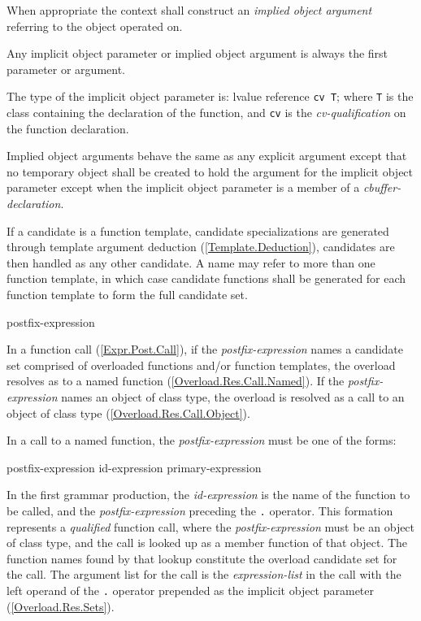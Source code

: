 \p When appropriate the context shall construct an \textit{implied object argument}
referring to the object operated on.

\p Any implicit object parameter or implied object argument is always
the first parameter or argument.

\p The type of the implicit object parameter is: lvalue reference \texttt{cv T}; where \texttt{T}
is the class containing the declaration of the function, and \texttt{cv} is the
\textit{cv-qualification} on the function declaration.

\p Implied object arguments behave the same as any explicit argument except that no temporary
object shall be created to hold the argument for the implicit object parameter
except when the implicit object parameter is a member of a
\textit{cbuffer-declaration}.

\p If a candidate is a function template, candidate specializations are generated
through template argument deduction (\ref{Template.Deduction}), candidates are
then handled as any other candidate. A name may refer to more than one function
template, in which case candidate functions shall be generated for each function
template to form the full candidate set.


\begin{innergrammar}
postfix-expression \terminal{(}  \terminal{)}
\end{innergrammar}

\p In a function call (\ref{Expr.Post.Call}), if the \textit{postfix-expression} names a
candidate set comprised of overloaded functions and/or function templates, the
overload resolves as to a named function (\ref{Overload.Res.Call.Named}). If the
\textit{postfix-expression} names an object of class type, the overload is resolved as a
call to an object of class type (\ref{Overload.Res.Call.Object}).


\p In a call to a named function, the \textit{postfix-expression} must be one of the
forms:

\begin{innergrammar}
\br
  postfix-expression  id-expression\br
  primary-expression
\end{innergrammar}

\p In the first grammar production, the \textit{id-expression} is the name of the function
to be called, and the \textit{postfix-expression} preceding the \texttt{.} operator. This
formation represents a \textit{qualified} function call, where the \textit{postfix-expression}
must be an object of class type, and the call is looked up as a member function
of that object. The function names found by that lookup constitute the overload
candidate set for the call. The argument list for the call is the
\textit{expression-list} in the call with the left operand of the \texttt{.} operator
prepended as the implicit object parameter (\ref{Overload.Res.Sets}).


